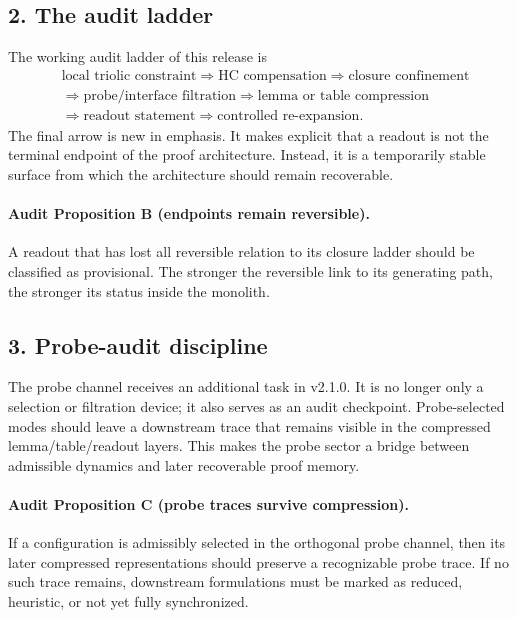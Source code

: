 \subsection*{2. The audit ladder}
The working audit ladder of this release is
\[
\begin{aligned}
&\text{local triolic constraint} \Longrightarrow \text{HC compensation} \Longrightarrow \text{closure confinement}\\
&\Longrightarrow \text{probe/interface filtration} \Longrightarrow \text{lemma or table compression}\\
&\Longrightarrow \text{readout statement} \Longrightarrow \text{controlled re-expansion}.
\end{aligned}
\]
The final arrow is new in emphasis. It makes explicit that a readout is not the
terminal endpoint of the proof architecture. Instead, it is a temporarily stable
surface from which the architecture should remain recoverable.

\paragraph{Audit Proposition B (endpoints remain reversible).}
A readout that has lost all reversible relation to its closure ladder should be
classified as provisional. The stronger the reversible link to its generating
path, the stronger its status inside the monolith.

\subsection*{3. Probe-audit discipline}
The probe channel receives an additional task in v2.1.0. It is no longer
only a selection or filtration device; it also serves as an audit checkpoint.
Probe-selected modes should leave a downstream trace that remains visible in the
compressed lemma/table/readout layers. This makes the probe sector a bridge
between admissible dynamics and later recoverable proof memory.

\paragraph{Audit Proposition C (probe traces survive compression).}
If a configuration is admissibly selected in the orthogonal probe channel, then
its later compressed representations should preserve a recognizable probe trace.
If no such trace remains, downstream formulations must be marked as reduced,
heuristic, or not yet fully synchronized.

